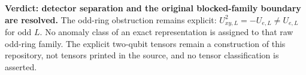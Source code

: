 \documentclass{article}
\begin{document}
\textbf{Verdict: detector separation and the original blocked-family boundary
    are resolved.} The odd-ring obstruction remains explicit:
$U_{xy,L}^2=-U_{e,L}\neq U_{e,L}$ for odd $L$. No anomaly class of an exact
representation is assigned to that raw odd-ring family. The explicit
two-qubit tensors remain a construction of this repository, not tensors
printed in the source, and no tensor classification is asserted.



\end{document}
